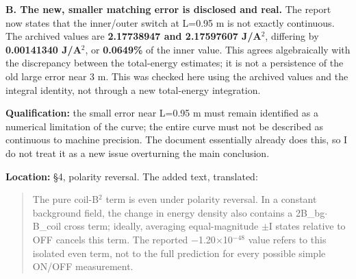 \documentclass[10pt,a4paper]{article}
\begin{document}
{\newpage
{}\par\vspace{2pt}
\noindent{\color{navy}\rule{\linewidth}{0.4pt}}\par\vspace{2pt}
\textbf{B. The new, smaller matching error is disclosed and real.} The report now states that the inner/outer switch at L=0.95 m is not exactly continuous. The archived values are \textbf{2.17738947 and 2.17597607 J/A$^2$}, differing by \textbf{0.00141340 J/A$^2$}, or \textbf{0.0649\%} of the inner value. This agrees algebraically with the discrepancy between the total-energy estimates; it is not a persistence of the old large error near 3 m. This was checked here using the archived values and the integral identity, not through a new total-energy integration.
\par
\textbf{Qualification:} the small error near L=0.95 m must remain identified as a numerical limitation of the curve; the entire curve must not be described as continuous to machine precision. The document essentially already does this, so I do not treat it as a new issue overturning the main conclusion.
\par
\vspace{2pt}\par\vspace{0.5pt}
\par
\textbf{Location:} \S4, polarity reversal. The added text, translated:
\par
\begin{quote}\vspace{-3pt}
The pure coil-B$^2$ term is even under polarity reversal. In a constant background field, the change in energy density also contains a 2B\_bg$\cdot$B\_coil cross term; ideally, averaging equal-magnitude $\pm$I states relative to OFF cancels this term. The reported $-$1.20$\times$10$^{-48}$ value refers to this isolated even term, not to the full prediction for every possible simple ON/OFF measurement.


\end{quote}}
\end{document}

